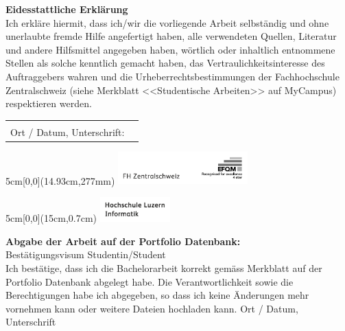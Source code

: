 \vspace*{1.00cm}

\noindent
\textbf{Eidesstattliche Erklärung}
\\
Ich erkl\"are hiermit, dass ich/wir die vorliegende Arbeit selbst\"andig und ohne unerlaubte fremde Hilfe angefertigt haben, alle verwendeten Quellen, Literatur und andere Hilfsmittel angegeben haben, w\"ortlich oder inhaltlich entnommene Stellen als solche kenntlich gemacht haben, das Vertraulichkeitsinteresse des Auftraggebers wahren und die Urheberrechtsbestimmungen der Fachhochschule Zentralschweiz (siehe Merkblatt <<Studentische Arbeiten>> auf MyCampus) respektieren werden.

\vspace{2em}

\noindent
\begin{tabularx}{\textwidth}{@{}lX}
	&\\
	Ort / Datum, Unterschrift: &  \\
	\cline{2-2}
\end{tabularx}

\begin{textblock*}{5cm}[0,0](14.93cm,277mm)
	\includegraphics[keepaspectratio,width=5cm]{img/FHZ_Logo}
\end{textblock*}

\newpage

\begin{textblock*}{5cm}[0,0](15cm,0.7cm)
	\includegraphics[keepaspectratio,width=2.7cm]{img/HSLU_Logo_Header}
\end{textblock*}

\noindent
\textbf{Abgabe der Arbeit auf der Portfolio Datenbank:}\\
Best\"atigungsvisum Studentin/Student\\
Ich best\"atige, dass ich die Bachelorarbeit korrekt gem\"ass Merkblatt auf der Portfolio Datenbank abgelegt habe. Die Verantwortlichkeit sowie die Berechtigungen habe ich abgegeben, so dass ich keine \"Anderungen mehr vornehmen kann oder weitere Dateien hochladen kann. \newline \newline 
Ort / Datum, Unterschrift	\underline{\hspace*{10cm}} \newline \newline \newline


